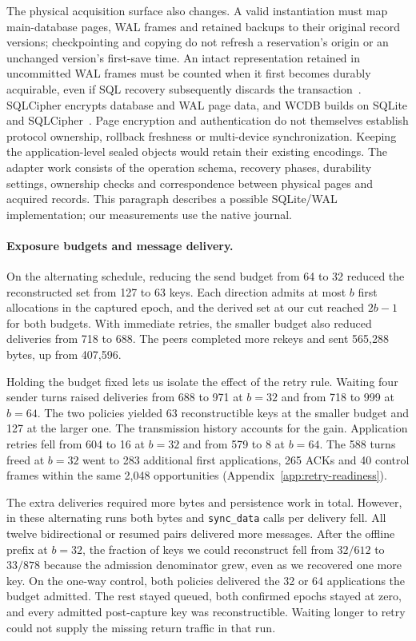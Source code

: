 \documentclass[pdflatex]{sn-jnl}
\theoremstyle{thmstyleone}
\theoremstyle{thmstylethree}
\theoremstyle{thmstyletwo}
\begin{document}
The physical acquisition surface also changes. A valid instantiation must
map main-database pages, WAL frames and retained backups to their original
record versions; checkpointing and copying do not refresh a reservation's
origin or an unchanged version's first-save time. An intact representation
retained in uncommitted WAL frames must be counted when it first becomes
durably acquirable, even if SQL recovery subsequently discards the
transaction~\cite{sqliteWalInterface}. SQLCipher encrypts database and WAL
page data, and WCDB builds on SQLite and
SQLCipher~\cite{sqlcipherDesign,wcdb}. Page encryption and authentication do
not themselves establish protocol ownership, rollback freshness or
multi-device synchronization. Keeping the application-level sealed objects
would retain their existing encodings. The adapter work consists of the
operation schema, recovery phases, durability settings, ownership checks
and correspondence between physical pages and acquired records. This
paragraph describes a possible SQLite/WAL implementation; our measurements
use the native journal.

\paragraph{Exposure budgets and message delivery.}
On the alternating schedule, reducing the send budget from 64 to 32
reduced the reconstructed set from 127 to 63 keys. Each direction
admits at most $b$ first allocations in the captured epoch, and the
derived set at our cut reached $2b-1$ for both budgets. With immediate
retries, the smaller budget also reduced deliveries from 718 to 688.
The peers completed more rekeys and sent 565,288 bytes, up from 407,596.

Holding the budget fixed lets us isolate the effect of the retry
rule. Waiting four sender turns raised deliveries from 688 to 971 at
$b=32$ and from 718 to 999 at $b=64$. The two policies yielded 63
reconstructible keys at the smaller budget and 127 at the larger one.
The transmission history accounts for the gain. Application retries
fell from 604 to 16 at $b=32$ and from 579 to 8 at $b=64$. The 588
turns freed at $b=32$ went to 283 additional first applications, 265
ACKs and 40 control frames within the same 2,048 opportunities
(Appendix~\ref{app:retry-readiness}).

The extra deliveries required more bytes and persistence work in total.
However, in these alternating runs both bytes and \texttt{sync\_data} calls per
delivery fell. All twelve bidirectional or resumed pairs delivered more
messages. After the offline prefix at $b=32$, the fraction of keys we
could reconstruct fell from $32/612$ to $33/878$ because the admission
denominator grew, even as we recovered one more key. On the one-way
control, both policies delivered the 32 or 64 applications the budget
admitted.
The rest stayed queued, both confirmed epochs stayed at zero, and every
admitted post-capture key was reconstructible. Waiting longer to retry
could not supply the missing return traffic in that run.
\end{document}
